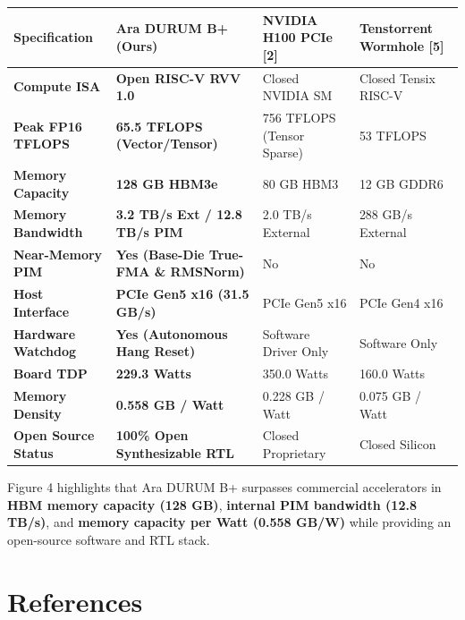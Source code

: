 \documentclass[journal,10pt,twocolumn]{IEEEtran}
\begin{document}
\begin{table}[htbp]
\centering\footnotesize
\begin{tabular}{p{} p{} p{} p{}}
\toprule
\textbf{Specification} & \textbf{Ara DURUM B+ (Ours)} & \textbf{NVIDIA H100 PCIe [2]} & \textbf{Tenstorrent Wormhole [5]} \\
\midrule
\textbf{Compute ISA} & \textbf{Open RISC-V RVV 1.0} & Closed NVIDIA SM & Closed Tensix RISC-V \\
\textbf{Peak FP16 TFLOPS} & \textbf{65.5 TFLOPS (Vector/Tensor)} & 756 TFLOPS (Tensor Sparse) & 53 TFLOPS \\
\textbf{Memory Capacity} & \textbf{128 GB HBM3e} & 80 GB HBM3 & 12 GB GDDR6 \\
\textbf{Memory Bandwidth} & \textbf{3.2 TB/s Ext / 12.8 TB/s PIM} & 2.0 TB/s External & 288 GB/s External \\
\textbf{Near-Memory PIM} & \textbf{Yes (Base-Die True-FMA \& RMSNorm)} & No & No \\
\textbf{Host Interface} & \textbf{PCIe Gen5 x16 (31.5 GB/s)} & PCIe Gen5 x16 & PCIe Gen4 x16 \\
\textbf{Hardware Watchdog} & \textbf{Yes (Autonomous Hang Reset)} & Software Driver Only & Software Only \\
\textbf{Board TDP} & \textbf{229.3 Watts} & 350.0 Watts & 160.0 Watts \\
\textbf{Memory Density} & \textbf{0.558 GB / Watt} & 0.228 GB / Watt & 0.075 GB / Watt \\
\textbf{Open Source Status} & \textbf{100\% Open Synthesizable RTL} & Closed Proprietary & Closed Silicon \\
\bottomrule
\end{tabular}
\vspace{4pt}
\end{table}

Figure 4 highlights that Ara DURUM B+ surpasses commercial accelerators in \textbf{HBM memory capacity (128 GB)}, \textbf{internal PIM bandwidth (12.8 TB/s)}, and \textbf{memory capacity per Watt (0.558 GB/W)} while providing an open-source software and RTL stack.


\section{References}
\end{document}
